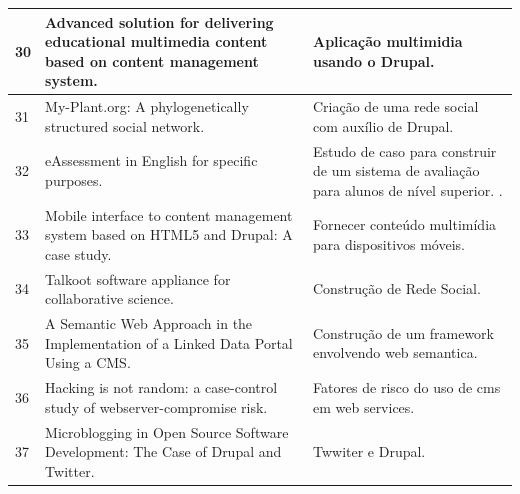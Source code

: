 \begin{apendicesenv}
\begin{landscape}
\begin{longtable}{|p{10pt}|p{320pt}|p{315pt}|}
 	 	    	 	
 	 	  {\raggedright 30}
 	 	   	 	 & {\raggedright Advanced solution for delivering educational multimedia content based on content management system.}
 	 	   	 	 & {\raggedright Aplicação multimidia usando o Drupal.\cite{Cymbalak2012}} \\
 	 	   	 	\hline
	{\raggedright 31}
 	 	  	 & {\raggedright My-{Plant}.org: {A} phylogenetically structured social network.}
 	 	  	 	 	 	 	 	 & {\raggedright Criação de uma rede social com auxílio de Drupal.\cite{Hanlon2010}} \\
 	 	  	 	 	 	 	 	\hline
 	 	  	 	
 	 	  	 {\raggedright 32}
 	 	  	  	 	   	 	 & {\raggedright {eAssessment} in {English} for specific purposes.}
 	 	  	  	 	   	 	 & {\raggedright Estudo de caso para construir de um sistema de avaliação para alunos de nível superior.
 	 	  	  	 	   	 	 .\cite{Polic2014}} \\
 	 	  	  	 	   	 	\hline	
 	 	  	 	
 	 	  	 	
 	 	  	 	{\raggedright 33}
 	 	  	 	 	 	 & {\raggedright Mobile interface to content management system based on {HTML}5 and {Drupal}: {A} case study. }
 	 	  	 	 	 	 & {\raggedright Fornecer conteúdo multimídia para dispositivos móveis.\cite{Priya2012}} \\
 	 	  	 	 	 	\hline
 	 	  	 	 	 	
 	 	  
 	 	   
 	 	   {\raggedright 34}
 	 	    	 	 & {\raggedright Talkoot software appliance for collaborative science.}
 	 	    	 	 & {\raggedright Construção de Rede Social.\cite{Ramachandran2009}} \\
 	 	    	 	\hline
 	 	    	 	
 	 	    	 	
 	 	  {\raggedright 35}
 	 	   	 	 & {\raggedright A {Semantic} {Web} {Approach} in the {Implementation} of a {Linked} {Data} {Portal} {Using} a {CMS}.}
 	 	   	 	 & {\raggedright Construção de um framework envolvendo web semantica.\cite{Giannopoulou2014}} \\
 	 	   	 	\hline
	{\raggedright 36}
 	 	  	 	 	 	 & {\raggedright Hacking is not random: a case-control study of webserver-compromise risk. }
 	 	  	 	 	 	 & {\raggedright Fatores de risco do uso de cms em web services. \cite{Vasek2015}} \\
 	 	  	 	 	 	\hline
 	 	  	 	 	 	
 	 	  
 	 	   
 	 	   {\raggedright 37}
 	 	    	 	 & {\raggedright Microblogging in {Open} {Source} {Software} {Development}: {The} {Case} of {Drupal} and {Twitter}.}
 	 	    	 	 & {\raggedright Twwiter e Drupal.\cite{Wang2014}} \\
 	 	    	 	\hline
 	 	    	 	

\end{longtable}
\end{landscape}
\end{apendicesenv}
